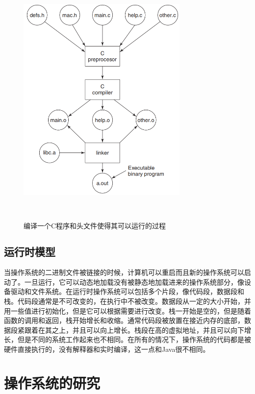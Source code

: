 	\begin{figure}[ht]\small
		\centering
		\includegraphics[width=0.75\textwidth]{FIG/1-30.png}
		\caption{编译一个C程序和头文件使得其可以运行的过程}　\label{fig:compile}
	\end{figure}
	
	\subsection{运行时模型}
	
	当操作系统的二进制文件被链接的时候，计算机可以重启而且新的操作系统可以启动了。一旦运行，它可以动态地加载没有被静态地加载进来的操作系统部分，像设备驱动和文件系统。在运行时操作系统可以包括多个片段，像代码段，数据段和栈。代码段通常是不可改变的，在执行中不被改变。数据段从一定的大小开始，并用一些值进行初始化，但是它可以根据需要进行改变。栈一开始是空的，但是随着函数的调用和返回，栈开始增长和收缩。通常代码段被放置在接近内存的底部，数据段紧跟着在其之上，并且可以向上增长。栈段在高的虚拟地址，并且可以向下增长，但是不同的系统工作起来也不相同。在所有的情况下，操作系统的代码都是被硬件直接执行的，没有解释器和实时编译，这一点和Java很不相同。
	
	\section{操作系统的研究}
	
